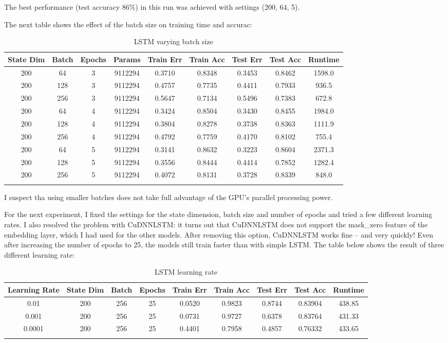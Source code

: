\documentclass[letterpaper, 10pt]{article}
\begin{document}
The best performance (test accuracy 86\%) in this run
was achieved with settings (200, 64, 5).

The next table shows the effect of the batch size on training time
and accurac:

\begin{longtable}{c | c | c | c | c | c | c | c | c}
State Dim & Batch & Epochs & Params & Train Err & Train Acc & Test Err & Test Acc & Runtime\\
\hline
\endhead
200 & 64 & 3 & 9112294 & 0.3710 & 0.8348 & 0.3453 & 0.8462 & 1598.0 \\
200 & 128 & 3 & 9112294 & 0.4757 & 0.7735 & 0.4411 & 0.7933 & 936.5 \\
200 & 256 & 3 & 9112294 & 0.5647 & 0.7134 & 0.5496 & 0.7383 & 672.8 \\
\hline
200 & 64 & 4 & 9112294 & 0.3424 & 0.8504 & 0.3430 & 0.8455 & 1984.0 \\
200 & 128 & 4 & 9112294 & 0.3804 & 0.8278 & 0.3738 & 0.8363 & 1111.9 \\
200 & 256 & 4 & 9112294 & 0.4792 & 0.7759 & 0.4170 & 0.8102 & 755.4 \\
\hline
200 & 64 & 5 & 9112294 & 0.3141 & 0.8632 & 0.3223 & 0.8604 & 2371.3 \\
200 & 128 & 5 & 9112294 & 0.3556 & 0.8444 & 0.4414 & 0.7852 & 1282.4 \\
200 & 256 & 5 & 9112294 & 0.4072 & 0.8131 & 0.3728 & 0.8339 & 848.0 \\
\caption{LSTM varying batch size}
\label{tab:batchsizelstm}
\end{longtable}

I suspect tha using smaller batches does not take full advantage of the
GPU's parallel processing power.

For the next experiment, I fixed the settings for the state dimension, batch size
and number of epochs and tried a few different learning rates. I also
resolved the problem with CuDNNLSTM: it turns out that CuDNNLSTM does not support
the mask\_zero feature of the embedding layer, which I had used for the other
models. After removing this option, CuDNNLSTM works fine -- and very quickly!
Even after increasing the number of epochs to 25, the models still train faster
than with simple LSTM. The table below shows the result of three different learning rate:

\begin{longtable}{c | c | c | c | c | c | c | c | c}
Learning Rate & State Dim & Batch & Epochs & Train Err & Train Acc & Test Err & Test Acc & Runtime\\
\hline
\endhead
0.01 & 200 & 256 & 25 & 0.0520 & 0.9823 & 0.8744 & 0.83904 & 438.85 \\
0.001 & 200 & 256 & 25 & 0.0731 & 0.9727 & 0.6378 & 0.83764 & 431.33 \\
0.0001 & 200 & 256 & 25 & 0.4401 & 0.7958 & 0.4857 & 0.76332 & 433.65 \\
\caption{LSTM learning rate}
\label{tab:learningratelstm}
\end{longtable}
\end{document}
